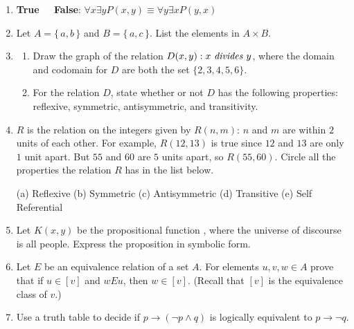 \documentclass[11pt]{amsart}
\begin{document}
\begin{enumerate}
\medskip 
\item {\bf True \ \  False}: $\forall{x}\exists{y} P(x,y) \equiv \forall{y}\exists{x}P(y,x)$ 
\medskip 
\item Let $A=\{\, a,b\,\}$ and $B=\{\,a,c\,\}$. List the elements in $A \times B$.
\medskip 
\item 
\begin{enumerate}
\item Draw the graph of the relation $D(x,y): x \text{ \it divides } y$, where
the domain and codomain for $D$ are both the set $\{2,3,4,5,6\}$.

\item For the relation $D$, state whether or not $D$ has the 
following properties: reflexive, symmetric, antisymmetric, and transitivity.
\end{enumerate}
 \medskip 
 
\item $R$ is the relation on the integers given by $R(n,m)$: $n$ and $m$ are within $2$ units of each other.
 For example,
$R(12,13)$ is true since $12$ and $13$ are only $1$ unit apart. But $55$ and $60$ are $5$ units apart,
so $R(55,60)$. Circle all the  properties the 
relation $R$ has in the list below.

\vskip 5pt
\hskip 20pt (a) Reflexive\hfill
\vskip 5pt
\hskip 20pt (b) Symmetric\hfill
\vskip 5pt
\hskip 20pt (c) Antisymmetric\hfill
\vskip 5pt
\hskip 20pt (d) Transitive\hfill
\vskip 5pt
\hskip 20pt (e) Self Referential\hfill
\medskip 
\item Let $K(x,y)$ be the propositional function , where the universe of discourse is all people. Express the proposition  in symbolic  form.
\medskip 
\item Let $E$ be an equivalence relation of a set $A$. For elements $u,v,w\in A$ prove that if $u\in [v]$ and
$wEu$, then $w\in [v]$. (Recall that $[v]$ is the equivalence class of $v$.)
\medskip 
\item   Use a truth table to decide if $p\rightarrow(\lnot p\land q)$ is logically equivalent
to $p\rightarrow \lnot q$.

\end{enumerate}
\end{document}
